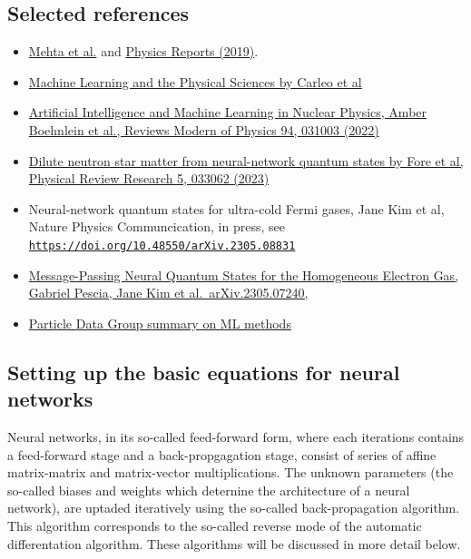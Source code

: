 \documentclass[%
oneside,                 %
final,                   %
10pt]{article}
\begin{document}
\subsection{Selected references}
\begin{block}{}
\begin{itemize}
\item \href{{https://arxiv.org/abs/1803.08823}}{Mehta et al.} and \href{{https://www.sciencedirect.com/science/article/pii/S0370157319300766?via%3Dihub}}{Physics Reports (2019)}.

\item \href{{https://link.aps.org/doi/10.1103/RevModPhys.91.045002}}{Machine Learning and the Physical Sciences by Carleo et al}

\item \href{{https://journals.aps.org/rmp/abstract/10.1103/RevModPhys.94.031003}}{Artificial Intelligence and Machine Learning in Nuclear Physics, Amber Boehnlein et al., Reviews Modern of Physics 94, 031003 (2022)} 

\item \href{{https://journals.aps.org/prresearch/pdf/10.1103/PhysRevResearch.5.033062}}{Dilute neutron star matter from neural-network quantum states by Fore et al, Physical Review Research 5, 033062 (2023)}

\item Neural-network quantum states for ultra-cold Fermi gases, Jane Kim et al, Nature Physics Communcication, in press, see \href{{https://doi.org/10.48550/arXiv.2305.08831}}{\nolinkurl{https://doi.org/10.48550/arXiv.2305.08831}}

\item \href{{https://doi.org/10.48550/arXiv.2305.07240}}{Message-Passing Neural Quantum States for the Homogeneous Electron Gas, Gabriel Pescia, Jane Kim et al.~arXiv.2305.07240,}

\item \href{{https://pdg.lbl.gov/2021/reviews/rpp2021-rev-machine-learning.pdf}}{Particle Data Group summary on ML methods}
\end{itemize}

\noindent
\end{block}

\subsection{Setting up the basic equations for neural networks}

Neural networks, in its so-called feed-forward form, where each
iterations contains a feed-forward stage and a back-propgagation
stage, consist of series of affine matrix-matrix and matrix-vector
multiplications. The unknown parameters (the so-called biases and
weights which deternine the architecture of a neural network), are
uptaded iteratively using the so-called back-propagation algorithm.
This algorithm corresponds to the so-called reverse mode of the
automatic differentation algorithm. These algorithms will be discussed
in more detail below.
\end{document}
